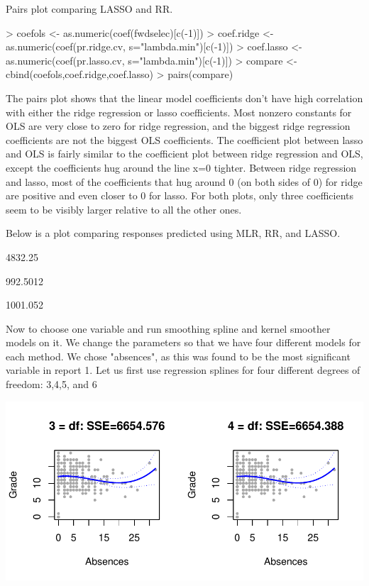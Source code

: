 \documentclass{article}
\begin{document}
Pairs plot comparing LASSO and RR.
\begin{Schunk}
\begin{Sinput}
> coefols <- as.numeric(coef(fwdselec)[c(-1)])
> coef.ridge <- as.numeric(coef(pr.ridge.cv, s="lambda.min")[c(-1)])
> coef.lasso <- as.numeric(coef(pr.lasso.cv, s="lambda.min")[c(-1)])
> compare <- cbind(coefols,coef.ridge,coef.lasso)
> pairs(compare)
\end{Sinput}
\end{Schunk}

The pairs plot shows that the linear model coefficients don’t have high correlation
with either the ridge regression or lasso coefficients. Most nonzero constants for OLS are very close to zero for ridge regression, and the biggest ridge regression coefficients are not the biggest OLS coefficients. The coefficient plot between lasso and OLS is fairly similar to the coefficient plot between ridge regression and OLS, except the coefficients hug around the line x=0 tighter. Between ridge regression and lasso, most of the coefficients that hug around 0 (on both sides of 0) for ridge are positive and even closer to 0 for lasso. For both plots, only three coefficients seem to be visibly larger relative to all the other ones.


Below is a plot comparing responses predicted using MLR, RR, and LASSO. 
\begin{Schunk}
\begin{Soutput}
[1] 4832.25
\end{Soutput}
\begin{Soutput}
[1] 992.5012
\end{Soutput}
\begin{Soutput}
[1] 1001.052
\end{Soutput}
\end{Schunk}

Now to choose one variable and run smoothing spline and kernel smoother models on it. We change the parameters so that we have four different models for each method. We chose "absences", as this was found to be the most significant variable in report 1.  Let us first use regression splines for four different degrees of freedom: 3,4,5, and 6

\includegraphics{Report_4-009}
\end{document}
